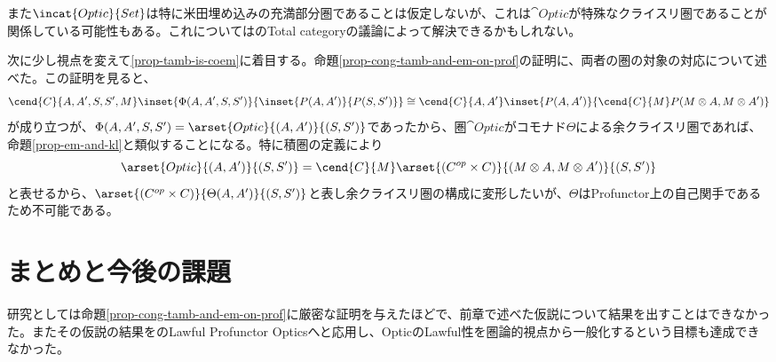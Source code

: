 \documentclass[uplatex,dvipdfmx]{jsarticle}
\begin{document}
  また$\incat{Optic}{Set}$は特に米田埋め込みの充満部分圏であることは仮定しないが、これは$\cat{Optic}$が特殊なクライスリ圏であることが関係している可能性もある。これについては\cite{yoneda_structures_on_2_category}のTotal categoryの議論によって解決できるかもしれない。

  次に少し視点を変えて\ref{prop-tamb-is-coem}に着目する。命題\ref{prop-cong-tamb-and-em-on-prof}の証明に、両者の圏の対象の対応について述べた。この証明を見ると、\[\cend{C}{A,A',S,S',M}\inset{\Phi(A,A',S,S')}{\inset{P(A,A')}{P(S,S')}}\cong
  \cend{C}{A,A'}\inset{P(A,A')}{\cend{C}{M}P(M\otimes A,M\otimes A')}\]が成り立つが、$\Phi(A,A',S,S')=\arset{Optic}{(A,A')}{(S,S')}$であったから、圏$\cat{Optic}$がコモナド$\Theta$による余クライスリ圏であれば、命題\ref{prop-em-and-kl}と類似することになる。特に積圏の定義により
  \[\arset{Optic}{(A,A')}{(S,S')} = \cend{C}{M}\arset{(C^{op}\times C)}{(M\otimes A,M\otimes A')}{(S,S')}\]と表せるから、$\arset{(C^{op}\times C)}{\Theta(A,A')}{(S,S')}$と表し余クライスリ圏の構成に変形したいが、$\Theta$はProfunctor上の自己関手であるため不可能である。
  \section{まとめと今後の課題}
  研究としては命題\ref{prop-cong-tamb-and-em-on-prof}に厳密な証明を与えたほどで、前章で述べた仮説について結果を出すことはできなかった。またその仮説の結果を\cite{categories_of_optics}のLawful Profunctor Opticsへと応用し、OpticのLawful性を圏論的視点から一般化するという目標も達成できなかった。
\end{document}

